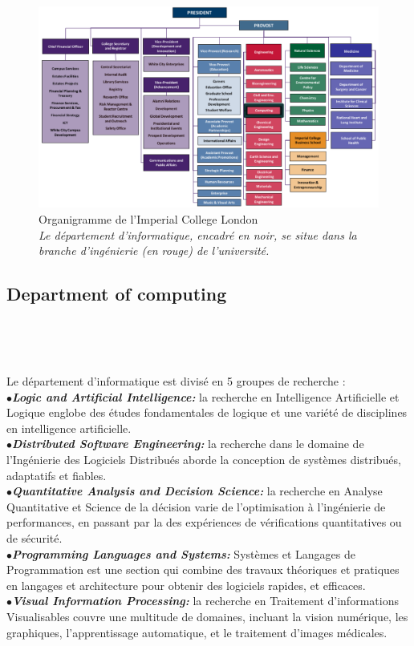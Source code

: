 \documentclass[10pt]{report}
\begin{document}
	\begin{figure}[h!]
		\begin{center}
			\includegraphics[width=18cm]{Reports/figures/College-Organisation.pdf}
		\end{center}
		\caption{Organigramme de l'Imperial College London \\ \textit{Le département d'informatique, encadré en noir, se situe dans la branche d'ingénierie (en rouge) de l'université.}}
		\label{Organigramme de l'Imperial College London}
	\end{figure}
	
	\subsection{Department of computing}~\par~\par
	
	Le département d'informatique est divisé en 5 groupes de recherche : 
	\\{$\bullet$}\textit{\textbf{Logic and Artificial Intelligence:}} la recherche en Intelligence Artificielle et Logique englobe des études fondamentales de logique et une variété de disciplines en intelligence artificielle.
	\\{$\bullet$}\textit{\textbf{Distributed Software Engineering:}} la recherche dans le domaine de l'Ingénierie des Logiciels Distribués aborde la conception de systèmes distribués, adaptatifs et fiables.
	\\{$\bullet$}\textit{\textbf{Quantitative Analysis and Decision Science:}} la recherche en Analyse Quantitative et Science de la décision varie de l'optimisation à l'ingénierie de performances, en passant par la des expériences de vérifications quantitatives ou de sécurité.
	\\{$\bullet$}\textit{\textbf{Programming Languages and Systems:}} Systèmes et Langages de Programmation est une section qui combine des travaux théoriques et pratiques en langages et architecture pour obtenir des logiciels rapides, et efficaces.
	\\{$\bullet$}\textit{\textbf{Visual Information Processing:}} la recherche en Traitement d'informations Visualisables couvre une multitude de domaines, incluant la vision numérique, les graphiques, l'apprentissage automatique, et le traitement d'images médicales.
	 
\end{document}
